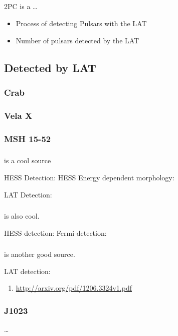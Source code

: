 \subsection{}

\Gls{2PC} is a \ldots
{}

\begin{itemize}
  \item Process of detecting Pulsars with the \gls{LAT}
  \item Number of pulsars detected by the \gls{LAT}
\end{itemize}

\subsection{ Detected by \Acrlong{LAT}}

\subsubsection{Crab}

\subsubsection{Vela X}

\subsubsection{MSH 15-52}


\subsubsection{}

 is a cool source

HESS Detection: 
HESS Energy dependent morphology: \cite{aharonian_2006a_energy-dependent}

LAT Detection: \cite{grondin_2011_detection-pulsar}



\subsubsection{}

 is also cool.

HESS detection:  \cite{aharonian_2006a_h.e.s.s.-survey}
Fermi detection: \cite{slane_2010_fermi-detection}

\subsubsection{}

 is another good source.

LAT detection: \cite{rousseau_2012_fermi-lat-constraints}

\begin{enumerate}
  \item \url{http://arxiv.org/pdf/1206.3324v1.pdf}
\end{enumerate}

\subsubsection{J1023}

\ldots
